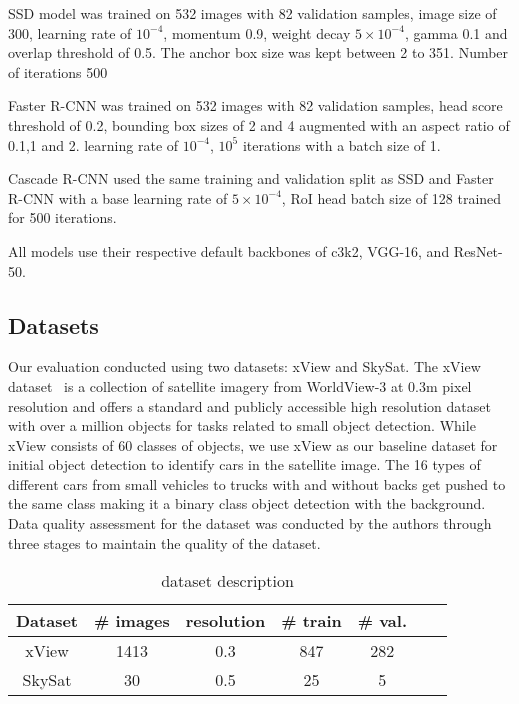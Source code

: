\documentclass{article}
\begin{document}
SSD model was trained on 532 images with 82 validation samples, image size of 300, learning rate of $10^{-4}$, momentum 0.9, weight decay $5 \times 10^{-4}$, gamma 0.1 and overlap threshold of 0.5. The anchor box size was kept between 2 to 351. Number of iterations 500

Faster R-CNN was trained on 532 images with 82 validation samples, head score threshold of 0.2, bounding box sizes of 2 and 4 augmented with an aspect ratio of 0.1,1 and 2. learning rate of $10^{-4}$, $10^5$ iterations with a batch size of 1.

Cascade R-CNN used the same training and validation split as SSD and Faster R-CNN with a base learning rate of $5 \times 10^{-4}$, RoI head batch size of 128 trained for 500 iterations.

All models use their respective default backbones of  c3k2, VGG-16, and ResNet-50.




\subsection{Datasets}
\label{subsec:datasets}


Our evaluation conducted using two datasets: xView and SkySat.
The xView dataset~\cite{2018lam} is a collection of satellite imagery from WorldView-3 at 0.3m pixel resolution and offers a standard and publicly accessible high resolution dataset with over a million objects for tasks related to small object detection. While xView consists of 60 classes of objects, we use xView as our baseline dataset for initial object detection to identify cars in the satellite image. The 16 types of different cars from small vehicles to trucks with and without backs get pushed to the same class making it a binary class object detection with the background. Data quality assessment for the dataset was conducted by the authors through three stages to maintain the quality of the dataset.

\begin{table}[!htb]
\begin{center}
\caption{dataset description}
\begin{tabular}{c|cccccc}
\hline
Dataset& \# images& resolution& \# train & \# val. \\
\hline\hline
xView&1413&0.3&847&282\\
SkySat&30&0.5&25&5\\
\hline
\end{tabular}\label{tb:xView description}
\end{center}
\end{table}
\end{document}
